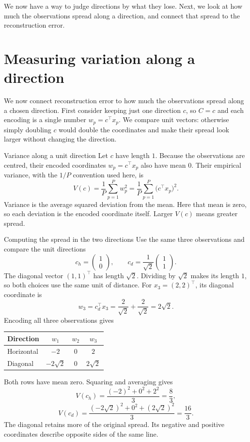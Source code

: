 \documentclass[a4paper,12pt,oneside]{report}
\begin{document}
We now have a way to judge directions by what they lose. Next, we
look at how much the observations spread along a direction, and
connect that spread to the reconstruction error.

\clearpage
\section{Measuring variation along a direction}

We now connect reconstruction error to how much the observations
spread along a chosen direction. First consider keeping just one
direction $c$, so $C=c$ and each encoding is a single number
$w_p=c^\top x_p$. We compare unit vectors: otherwise simply
doubling $c$ would double the coordinates and make their spread look
larger without changing the direction.

\begin{frameddefn}{Variance along a unit direction}\label{def:pca-directional-variance}
Let $c$ have length $1$. Because the observations are centred, their
encoded coordinates $w_p=c^\top x_p$ also have mean $0$.
Their empirical variance, with the $1/P$ convention used here, is
\[
  V(c)=\frac1P\sum_{p=1}^{P}w_p^2
      =\frac1P\sum_{p=1}^{P}\bigl(c^\top x_p\bigr)^2.
\]
Variance is the average squared deviation from the mean. Here that
mean is zero, so each deviation is the encoded coordinate itself.
Larger $V(c)$ means greater spread.
\end{frameddefn}

\begin{framedexample}{Computing the spread in the two directions}\label{ex:pca-variance-choice}
Use the same three observations and compare the unit directions
\[
  c_h=\begin{pmatrix}1\\0\end{pmatrix},\qquad
  c_d=\frac1{\sqrt2}\begin{pmatrix}1\\1\end{pmatrix}.
\]
The diagonal vector $(1,1)^\top$ has length $\sqrt2$. Dividing by
$\sqrt2$ makes its length $1$, so both choices use the same unit of
distance. For $x_3=(2,2)^\top$, its diagonal coordinate is
\[
  w_3=c_d^\top x_3
     =\frac2{\sqrt2}+\frac2{\sqrt2}=2\sqrt2.
\]
Encoding all three observations gives
\begin{center}
\begin{tabular}{@{}lccc@{}}
\toprule
\textbf{Direction} & $w_1$ & $w_2$ & $w_3$ \\
\midrule
Horizontal & $-2$ & $0$ & $2$ \\
Diagonal & $-2\sqrt2$ & $0$ & $2\sqrt2$ \\
\bottomrule
\end{tabular}
\end{center}
Both rows have mean zero. Squaring and averaging gives
\[
  V(c_h)=\frac{(-2)^2+0^2+2^2}{3}=\frac83,
\]
\[
  V(c_d)=\frac{(-2\sqrt2)^2+0^2+(2\sqrt2)^2}{3}=\frac{16}{3}.
\]
The diagonal retains more of the original spread. Its negative and
positive coordinates describe opposite sides of the same line.
\end{framedexample}
\end{document}
